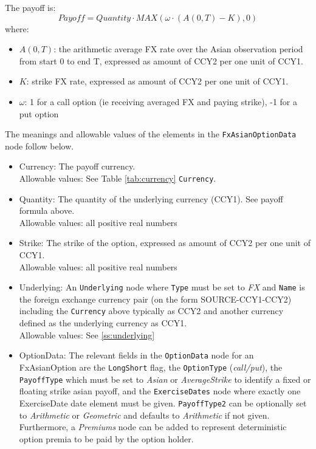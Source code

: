The payoff is: 
$$
Payoff = Quantity\cdot MAX(\omega\cdot(A(0,T) - K),0)
$$
where:
\begin{itemize}
\item $A(0,T)$: the arithmetic average FX rate over the Asian observation period from start 0 to end T, expressed as amount of CCY2 per one unit of CCY1.
\item $K$: strike FX rate, expressed as amount of CCY2 per one unit of CCY1.
\item $\omega$: 1 for a call option (ie receiving averaged FX and paying strike), -1 for a put option
\end{itemize}


The meanings and allowable values of the elements in the \lstinline!FxAsianOptionData!  node follow below.

\begin{itemize}
	\item Currency: The payoff currency. \\  %
	Allowable values: See Table \ref{tab:currency} \lstinline!Currency!.
	\item Quantity: The quantity of the underlying currency (CCY1). See payoff formula above.  \\
	Allowable values: all positive real numbers
	\item Strike: The strike of the option, expressed as amount of CCY2 per one unit of CCY1. \\
	Allowable values: all positive real numbers
	\item Underlying: An \lstinline!Underlying! node where \lstinline!Type! must be set to \emph{FX} and \lstinline!Name! is the foreign exchange currency pair (on the form SOURCE-CCY1-CCY2) including the \lstinline!Currency! above typically as CCY2 and another currency defined as the underlying currency as CCY1.   \\
	Allowable values:  See \ref{ss:underlying}
	\item OptionData: The relevant fields in the \lstinline!OptionData! node for an FxAsianOption are the \lstinline!LongShort! flag, the \lstinline!OptionType! (\emph{call/put}), the \lstinline!PayoffType! which must be set to \emph{Asian} or \emph{AverageStrike} to
	identify a fixed or floating strike asian payoff, and the \lstinline!ExerciseDates! node where exactly one ExerciseDate date element must be given. \lstinline!PayoffType2! can be optionally set to \emph{Arithmetic} or \emph{Geometric} and defaults to \emph{Arithmetic} if not given. Furthermore, a \emph{Premiums} node can be added to represent deterministic option premia to be paid by the option holder. \\

\end{itemize}
